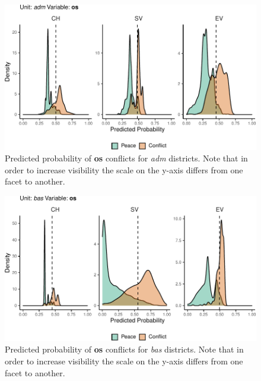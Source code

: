 \documentclass[a4paper,11pt]{article}
\begin{document}
\begin{figure}[H]

{\centering \includegraphics{thesis_files/figure-latex/appendix-densities-7} 

}

\caption[Predicted probability of \textbf{os} conflicts for \textit{adm} districts.]{Predicted probability of \textbf{os} conflicts for \textit{adm} districts. Note that in order to increase visibility the scale on the y-axis differs from one facet to another.}\label{fig:appendix-densities-7}
\end{figure}
\begin{figure}[H]

{\centering \includegraphics{thesis_files/figure-latex/appendix-densities-8} 

}

\caption[Predicted probability of \textbf{os} conflicts for \textit{bas} districts.]{Predicted probability of \textbf{os} conflicts for \textit{bas} districts. Note that in order to increase visibility the scale on the y-axis differs from one facet to another.}\label{fig:appendix-densities-8}
\end{figure}
\newpage
\end{document}
